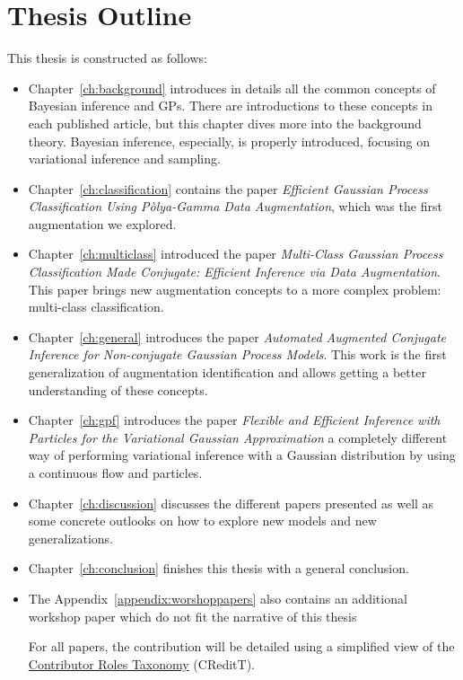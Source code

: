 \section{Thesis Outline}

This thesis is constructed as follows:
\begin{itemize}
    \item Chapter~\ref{ch:background} introduces in details all the common concepts of Bayesian inference and \ac{GPs}.
    There are introductions to these concepts in each published article, but this chapter dives more into the background theory.
    Bayesian inference, especially, is properly introduced, focusing on variational inference and sampling.
    \item Chapter~\ref{ch:classification} contains the paper \textit{Efficient Gaussian Process Classification Using P\`olya-Gamma Data Augmentation}, which was the first augmentation we explored.
    \item Chapter~\ref{ch:multiclass} introduced the paper \textit{Multi-Class Gaussian Process Classification Made Conjugate: Efficient Inference via Data Augmentation}.
    This paper brings new augmentation concepts to a more complex problem: multi-class classification.
    \item Chapter~\ref{ch:general} introduces the paper \textit{Automated Augmented Conjugate Inference for Non-conjugate Gaussian Process Models}.
    This work is the first generalization of augmentation identification and allows getting a better understanding of these concepts.
    \item Chapter~\ref{ch:gpf} introduces the paper \textit{Flexible and Efficient Inference with Particles for the Variational Gaussian Approximation } a completely different way of performing variational inference with a Gaussian distribution by using a continuous flow and particles.
    \item Chapter~\ref{ch:discussion} discusses the different papers presented as well as some concrete outlooks on how to explore new models and new generalizations.
    \item Chapter~\ref{ch:conclusion} finishes this thesis with a general conclusion.
    \item The Appendix~\ref{appendix:worshoppapers} also contains an additional workshop paper which do not fit the narrative of this thesis 

    For all papers, the contribution will be detailed using a simplified view of the \href{https://mdpi-res.com/data/contributor-role-instruction.pdf}{Contributor Roles Taxonomy} (CReditT).

\end{itemize}

